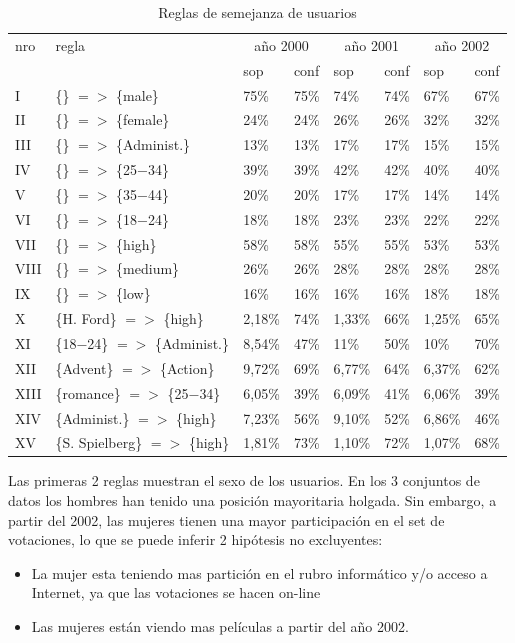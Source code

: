 \documentclass[journal]{IEEEtran}
\begin{document}
\begin{table}[ht!]
\caption{Reglas de semejanza de usuarios}
\label{comparacion}
\centering
\begin{tabular}{|l l ||l l|l l|l l|}
	\hline
	nro & regla & 
	\multicolumn{2}{c|}{año 2000} & 
	\multicolumn{2}{c|}{año 2001} & 
	\multicolumn{2}{c|}{año 2002} \\
	     &  & sop & conf & sop & conf & sop & conf \\
	\hline
	I    & \{\} $=$$>$ \{male\} & 75\% & 75\% & 74\% & 74\% & 67\% & 67\% \\
	II   & \{\} $=$$>$ \{female\} & 24\% & 24\% & 26\% & 26\% & 32\% & 32\% \\
	III  & \{\} $=$$>$ \{Administ.\} & 13\% & 13\% & 17\% & 17\% & 15\% & 15\% \\
	IV   & \{\} $=$$>$ \{25$-$34\} & 39\% & 39\% & 42\% & 42\% & 40\% & 40\% \\
	V    & \{\} $=$$>$ \{35$-$44\} & 20\% & 20\% & 17\% & 17\% & 14\% & 14\% \\
	VI   & \{\} $=$$>$ \{18$-$24\} & 18\% & 18\% & 23\% & 23\% & 22\% & 22\% \\
	VII  & \{\} $=$$>$ \{high\} & 58\% & 58\% & 55\% & 55\% & 53\% & 53\% \\
	VIII & \{\} $=$$>$ \{medium\} & 26\% & 26\% & 28\% & 28\% & 28\% & 28\% \\
	IX   & \{\} $=$$>$ \{low\} & 16\% & 16\% & 16\% & 16\% & 18\% & 18\% \\
	X    & \{H. Ford\} $=$$>$ \{high\} & 2,18\% & 74\% & 1,33\% & 66\% & 1,25\% & 65\% \\
	XI  & \{18$-$24\} $=$$>$ \{Administ.\} & 8,54\% & 47\% & 11\% & 50\% & 10\% & 70\% \\
	XII & \{Advent\} $=$$>$ \{Action\} & 9,72\% & 69\% & 6,77\% & 64\% & 6,37\% & 62\% \\
	XIII  & \{romance\} $=$$>$ \{25$-$34\} & 6,05\% & 39\% & 6,09\% & 41\% & 6,06\% & 39\% \\
	XIV   & \{Administ.\} $=$$>$ \{high\} & 7,23\% & 56\% & 9,10\% & 52\% & 6,86\% & 46\% \\
	XV  & \{S. Spielberg\} $=$$>$ \{high\} & 1,81\% & 73\% & 1,10\% & 72\% & 1,07\% & 68\% \\
	\hline
\end{tabular}
\end{table}

Las primeras 2 reglas muestran el sexo de los usuarios. 
En los 3 conjuntos de datos los hombres han tenido una posición mayoritaria holgada. 
Sin embargo, a partir del 2002, las mujeres tienen una
mayor participación en el set de votaciones, lo que se puede inferir 2 hipótesis
no excluyentes:
\begin{itemize}
\item La mujer esta teniendo mas partición en el rubro informático y/o acceso a Internet, ya que las 
votaciones se hacen on-line
\item Las mujeres están viendo mas películas a partir del año 2002.
\end{itemize}
\end{document}
